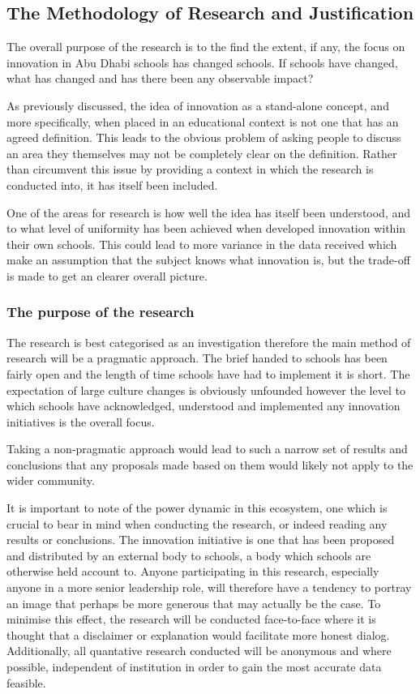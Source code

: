 \subsection{The Methodology of Research and Justification}
The overall purpose of the research is to the find the extent, if any, the focus on innovation in Abu Dhabi schools has changed schools. If schools have changed, what has changed and has there been any observable impact?

As previously discussed, the idea of innovation as a stand-alone concept, and more specifically, when placed in an educational context is not one that has an agreed definition. This leads to the obvious problem of asking people to discuss an area they themselves may not be completely clear on the definition. Rather than circumvent this issue by providing a context in which the research is conducted into, it has itself been included.

One of the areas for research is how well the idea has itself been understood, and to what level of uniformity has been achieved when developed innovation within their own schools. This could lead to more variance in the data received which make an assumption that the subject knows what innovation is, but the trade-off is made to get an clearer overall picture.

\subsubsection{The purpose of the research}
The research is best categorised as an investigation therefore the main method of research will be a pragmatic approach. The brief handed to schools has been fairly open and the length of time schools have had to implement it is short. The expectation of large culture changes is obviously unfounded however the level to which schools have acknowledged, understood and implemented any innovation initiatives is the overall focus. 

Taking a non-pragmatic approach would lead to such a narrow set of results and conclusions that any proposals made based on them would likely not apply to the wider community. 

It is important to note of the power dynamic in this ecosystem, one which is crucial to bear in mind when conducting the research, or indeed reading any results or conclusions. The innovation initiative is one that has been proposed and distributed by an external body to schools, a body which schools are otherwise held account to. Anyone participating in this research, especially anyone in a more senior leadership role, will therefore have a tendency to portray an image that perhaps be more generous that may actually be the case. To minimise this effect, the research will be conducted face-to-face where it is thought that a disclaimer or explanation would facilitate more honest dialog. Additionally, all quantative research conducted will be anonymous and where possible, independent of institution in order to gain the most accurate data feasible.


